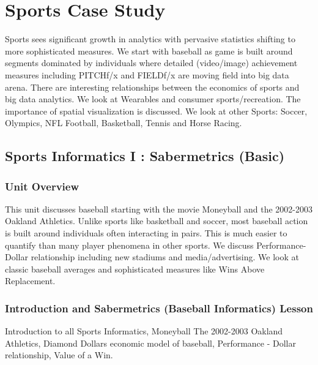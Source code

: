 

\section{Sports Case Study}\label{sports-case-study}

\FILENAME

Sports sees significant growth in analytics with pervasive statistics
shifting to more sophisticated measures. We start with baseball as game
is built around segments dominated by individuals where detailed
(video/image) achievement measures including PITCHf/x and FIELDf/x are
moving field into big data arena. There are interesting relationships
between the economics of sports and big data analytics. We look at
Wearables and consumer sports/recreation. The importance of spatial
visualization is discussed. We look at other Sports: Soccer, Olympics,
NFL Football, Basketball, Tennis and Horse Racing.

\subsection{Sports Informatics I : Sabermetrics
(Basic)}\label{sports-informatics-i-sabermetrics-basic}

\subsubsection{Unit Overview}\label{unit-overview}

This unit discusses baseball starting with the movie Moneyball and the
2002-2003 Oakland Athletics. Unlike sports like basketball and soccer,
most baseball action is built around individuals often interacting in
pairs. This is much easier to quantify than many player phenomena in
other sports. We discuss Performance-Dollar relationship including new
stadiums and media/advertising. We look at classic baseball averages and
sophisticated measures like Wins Above Replacement.




\subsubsection{Introduction and Sabermetrics (Baseball Informatics)
Lesson}\label{introduction-and-sabermetrics-baseball-informatics-lesson}

Introduction to all Sports Informatics, Moneyball The 2002-2003 Oakland
Athletics, Diamond Dollars economic model of baseball, Performance -
Dollar relationship, Value of a Win.



